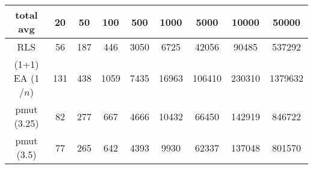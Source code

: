 \begin{tabular}[h]{ccccccccc}
total avg&20&50&100&500&1000&5000&10000&50000\\\hline
RLS&56&187&446&3050&6725&42056&90485&537292\\
(1+1) EA (1$/n$)&131&438&1059&7435&16963&106410&230310&1379632\\
pmut (3.25)&82&277&667&4666&10432&66450&142919&846722\\
pmut (3.5)&77&265&642&4393&9930&62337&137048&801570\\
\end{tabular}

